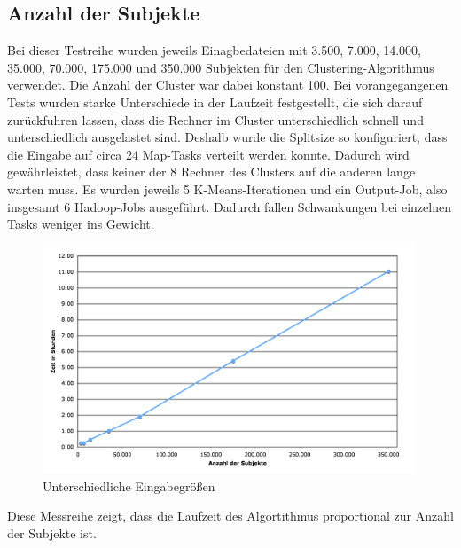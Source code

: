 \documentclass[a4paper]{llncs}
\begin{document}
\subsection{Anzahl der Subjekte}
Bei dieser Testreihe wurden jeweils Einagbedateien mit 3.500, 7.000, 14.000, 35.000, 70.000, 175.000 und 350.000 Subjekten für den Clustering-Algorithmus verwendet.
Die Anzahl der Cluster war dabei konstant 100.
Bei vorangegangenen Tests wurden starke Unterschiede in der Laufzeit festgestellt, die sich darauf zurückfuhren lassen, dass die Rechner im Cluster unterschiedlich schnell und unterschiedlich ausgelastet sind. Deshalb wurde die Splitsize so konfiguriert, dass die Eingabe auf circa 24 Map-Tasks verteilt werden konnte. Dadurch wird gewährleistet, dass keiner der 8 Rechner des Clusters auf die anderen lange warten muss.
Es wurden jeweils 5 K-Means-Iterationen und ein Output-Job, also insgesamt 6 Hadoop-Jobs ausgeführt. Dadurch fallen Schwankungen bei einzelnen Tasks weniger ins Gewicht.
\begin{figure}[!ht]
\centering
\includegraphics[width=0.99\textwidth]{charts/subjects.png}
\caption{Unterschiedliche Eingabegrößen}
\label{fig:subjects}
\end{figure}
Diese Messreihe zeigt, dass die Laufzeit des Algortithmus proportional zur Anzahl der Subjekte ist.
\end{document}
